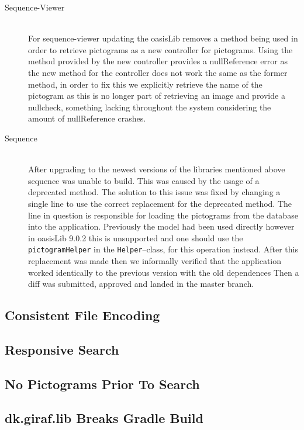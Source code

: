 \begin{description}
    \item[Sequence-Viewer] \hfill \\
    For sequence-viewer updating the oasisLib removes a method being used in order to retrieve pictograms as a new controller for pictograms.
    Using the method provided by the new controller provides a nullReference error as the new method for the controller does not work the same as the former method, in order to fix this we explicitly retrieve the name of the pictogram as this is no longer part of retrieving an image and provide a nullcheck, something lacking throughout the system considering the amount of nullReference crashes.
    \item[Sequence] \hfill \\
    After upgrading to the newest versions of the libraries mentioned above sequence was unable to build.
    This was caused by the usage of a deprecated method. 
    The solution to this issue was fixed by changing a single line to use the correct replacement for the deprecated method.
    The line in question is responsible for loading the pictograms from the database into the application. 
    Previously the model had been used directly however in oasisLib 9.0.2 this is unsupported and one should use the \texttt{pictogramHelper} in the \texttt{Helper}--class, for this operation instead.
    After this replacement was made then we informally verified that the application worked identically to the previous version with the old dependences
    Then a diff was submitted, approved and landed in the master branch. 
\end{description}
\subsection{Consistent File Encoding}
\subsection{Responsive Search}
\subsection{No Pictograms Prior To Search}
\subsection{dk.giraf.lib Breaks Gradle Build}
